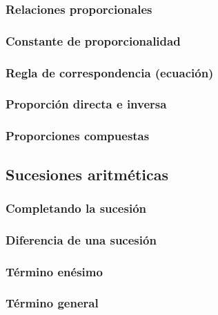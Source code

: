 \documentclass[12pt,addpoints]{evalua3}
\begin{document}
\begin{questions}
	\subsubsection{Relaciones proporcionales}
	\question{}
	\subsubsection{Constante de proporcionalidad}
	\question{}
	\subsubsection{Regla de correspondencia (ecuación)}
	\question{}
	\subsubsection{Proporción directa e inversa}
	\question{}
	\subsubsection{Proporciones compuestas}
	\question{}
	\subsection   {Sucesiones aritméticas}
	\subsubsection{Completando la sucesión}
	\question{}
	\subsubsection{Diferencia de una sucesión}
	\question{}
	\subsubsection{Término enésimo}
	\question{}
	\subsubsection{Término general}
	\question{}

\end{questions}
\end{document}
